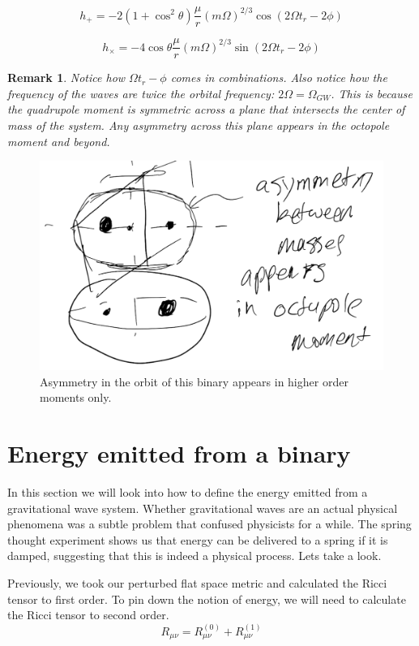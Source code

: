 \documentclass{article}
\newtheorem*{remark}{Remark}
\theoremstyle{definition}
\theoremstyle{remark}
\begin{document}
$$
h_+ = -2 (1+\cos ^2 \theta ) \frac{\mu}{r} (m \Omega)^{2/3} \cos(2 \Omega t_r - 2 \phi)
$$

$$
h_\times = -4 \cos \theta \frac{\mu}{r} (m \Omega)^{2/3} \sin(2 \Omega t_r - 2 \phi)
$$

\begin{remark}
Notice how $\Omega t_r - \phi$ comes in combinations. Also notice how the frequency of the waves are twice the orbital frequency: $2\Omega = \Omega_{GW}$. This is because the quadrupole moment is symmetric across a plane that intersects the center of mass of the system. Any asymmetry across this plane appears in the octopole moment and beyond.
\end{remark}

\begin{figure}
    \centering
    \includegraphics{figures/asymmetry_in_orbit.png}
    \caption{Asymmetry in the orbit of this binary appears in higher order moments only.}
    \label{fig:asymmetry}
\end{figure}

\section{Energy emitted from a binary}
In this section we will look into how to define the energy emitted from a gravitational wave system. Whether gravitational waves are an actual physical phenomena was a subtle problem that confused physicists for a while. The spring thought experiment shows us that energy can be delivered to a spring if it is damped, suggesting that this is indeed a physical process. Lets take a look.

Previously, we took our perturbed flat space metric and calculated the Ricci tensor to first order. To pin down the notion of energy, we will need to calculate the Ricci tensor to second order.
$$
R_{\mu \nu} = R_{\mu \nu}^{(0)} + R_{\mu \nu}^{(1)}
$$
\end{document}
